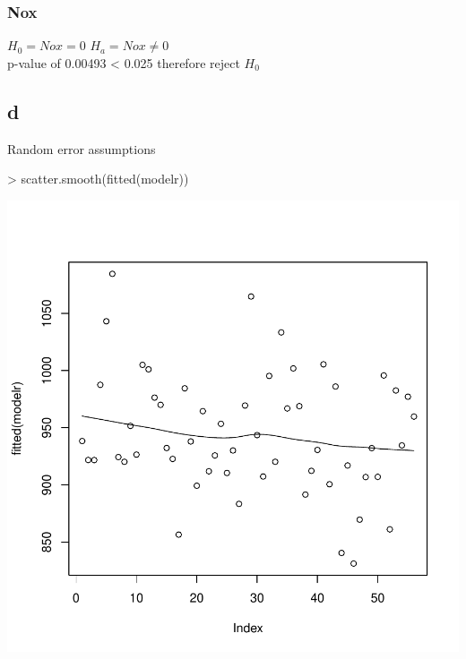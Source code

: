 \documentclass{article}
\begin{document}
\subsubsection*{Nox}
$H_0=Nox=0$
$H_a=Nox \neq 0$
\\
p-value of 0.00493 < 0.025 therefore reject $H_0$

\subsection*{d}
Random error assumptions

\begin{Schunk}
\begin{Sinput}
> scatter.smooth(fitted(modelr))
\end{Sinput}
\end{Schunk}
\includegraphics{Assignment2b-005}
\end{document}
